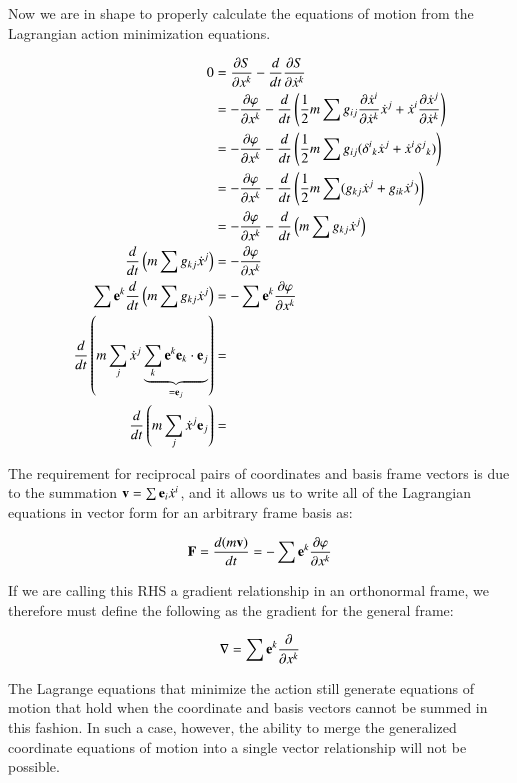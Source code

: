 \documentclass{article}
\newcommand{\grad}[0]{\nabla}
\newcommand{\PD}[2]{ \frac{\partial{#1}}{\partial {#2}} }
\begin{document}
Now we are in shape to properly calculate the equations of motion from the Lagrangian action minimization equations.

\begin{align*}
0
&= \PD{S}{x^k} - \frac{d}{dt}\PD{S}{\dot{x}^k} \\
&= -\PD{\varphi}{x^k} - \frac{d}{dt} \left( \inv{2} m \sum g_{ij} \PD{\dot{x}^i}{\dot{x}^k} \dot{x}^j + \dot{x}^i \PD{\dot{x}^j}{\dot{x}^k} \right) \\
&= -\PD{\varphi}{x^k} - \frac{d}{dt} \left( \inv{2} m \sum g_{ij} ({\delta^i}_k \dot{x}^j + \dot{x}^i {\delta^j}_k) \right) \\
&= -\PD{\varphi}{x^k} - \frac{d}{dt} \left( \inv{2} m \sum (g_{kj} \dot{x}^j + g_{ik}\dot{x}^i) \right) \\
&= -\PD{\varphi}{x^k} - \frac{d}{dt} \left( m \sum g_{kj} \dot{x}^j \right) \\
\frac{d}{dt} \left( m \sum g_{kj} \dot{x}^j \right) &= -\PD{\varphi}{x^k} \\
\sum \Be^k \frac{d}{dt} \left( m \sum g_{kj} \dot{x}^j \right) &= - \sum \Be^k \PD{\varphi}{x^k} \\
\frac{d}{dt} \left( m \sum_j \dot{x}^j \underbrace{\sum_k \Be^k \Be_k \cdot \Be_j}_{=\Be_j} \right) &= \\
\frac{d}{dt} \left( m \sum_j \dot{x}^j \Be_j \right) &= \\
\end{align*}

The requirement for reciprocal pairs of coordinates and basis frame vectors is due to the
summation $\mathbf{v} = \sum \mathbf{e}_i \dot{x}^i$, and it allows us to write all of the Lagrangian equations
in vector form for an arbitrary frame basis as:

\begin{equation}
\BF = \frac{d (m \Bv)}{dt} = - \sum \Be^k \PD{\varphi}{x^k}
\end{equation}

If we are calling this RHS a gradient relationship in an orthonormal frame, we therefore must define
the following as the gradient for the general frame:

\begin{equation}\label{eqn:gradient}
\grad = \sum \Be^k \PD{}{x^k}
\end{equation}

The Lagrange equations that minimize the action still generate equations of
motion that hold when the coordinate and basis vectors cannot be summed in this fashion.
In such a case, however, the ability to merge the generalized coordinate equations of motion into a single
vector relationship will not be possible.
\end{document}
